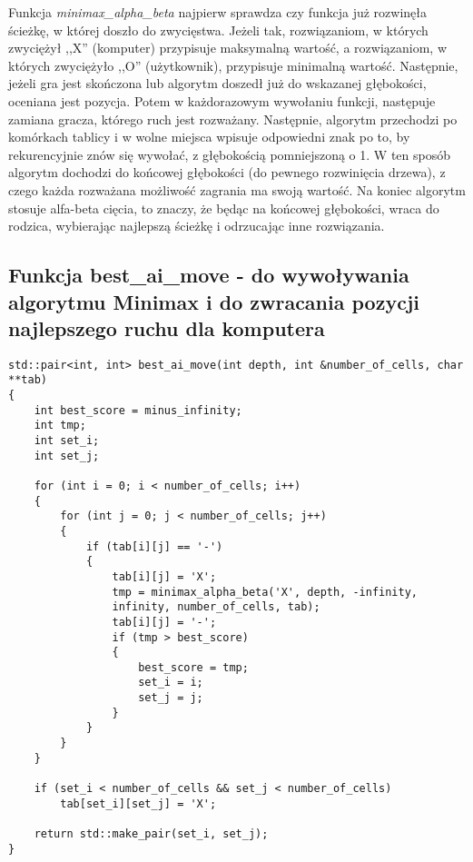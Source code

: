 \documentclass[12pt]{article}
\begin{document}
Funkcja \textit{minimax\_alpha\_beta} najpierw sprawdza czy funkcja już rozwinęła ścieżkę, w której doszło do zwycięstwa. Jeżeli tak, rozwiązaniom, w których zwyciężył ,,X'' (komputer) przypisuje maksymalną wartość, a rozwiązaniom, w których zwyciężyło ,,O'' (użytkownik), przypisuje minimalną wartość. Następnie, jeżeli gra jest skończona lub algorytm doszedł już do wskazanej głębokości, oceniana jest pozycja. Potem w każdorazowym wywołaniu funkcji, następuje zamiana gracza, którego ruch jest rozważany. Następnie, algorytm przechodzi po komórkach tablicy i w wolne miejsca wpisuje odpowiedni znak po to, by rekurencyjnie znów się wywołać, z głębokością pomniejszoną o 1. W ten sposób algorytm dochodzi do końcowej głębokości (do pewnego rozwinięcia drzewa), z czego każda rozważana możliwość zagrania ma swoją wartość. Na koniec algorytm stosuje alfa-beta cięcia, to znaczy, że będąc na końcowej głębokości, wraca do rodzica, wybierając najlepszą ścieżkę i odrzucając inne rozwiązania.


\subsection{Funkcja {best\_ai\_move} - do wywoływania algorytmu Minimax i do zwracania pozycji najlepszego ruchu dla komputera}


\begin{lstlisting}
std::pair<int, int> best_ai_move(int depth, int &number_of_cells, char **tab)
{
    int best_score = minus_infinity;
    int tmp;
    int set_i;
    int set_j;

    for (int i = 0; i < number_of_cells; i++)
    {
        for (int j = 0; j < number_of_cells; j++)
        {
            if (tab[i][j] == '-')
            {
                tab[i][j] = 'X';
                tmp = minimax_alpha_beta('X', depth, -infinity,
                infinity, number_of_cells, tab);
                tab[i][j] = '-';
                if (tmp > best_score)
                {
                    best_score = tmp;
                    set_i = i;
                    set_j = j;
                }
            }
        }
    }

    if (set_i < number_of_cells && set_j < number_of_cells)
        tab[set_i][set_j] = 'X';

    return std::make_pair(set_i, set_j);
}

\end{lstlisting}
\end{document}
